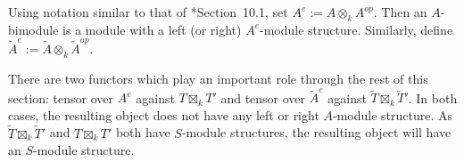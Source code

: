 \documentclass{amsart}
\newcommand{\field}{k}
\theoremstyle{remark}
\begin{document}
Using notation similar to that of \cite{associative-algebras-book}*{Section~10.1},
set $A^{e}:= A\otimes_{\field} A^{op}$. Then an $A$-bimodule is a module with a left (or right) $A^{e}$-module structure.
Similarly, define $\widetilde{A}^e:= \widetilde{A}\otimes_{\field}\widetilde{A}^{op}$.

There are two functors which play an important role through the rest of this section: tensor over $A^{e}$ against $T\boxtimes_{\field} T'$ and tensor over $\widetilde{A}^e$ against $\widetilde{T}\boxtimes_{\field} \widetilde{T}'$.
In both cases, the resulting object does not have any left or right $A$-module structure. As $\widetilde{T}\boxtimes_{\field} \widetilde{T}'$ and $T\boxtimes_{\field} T'$ both have $S$-module structures, the resulting object will have an $S$-module structure. 
\end{document}
